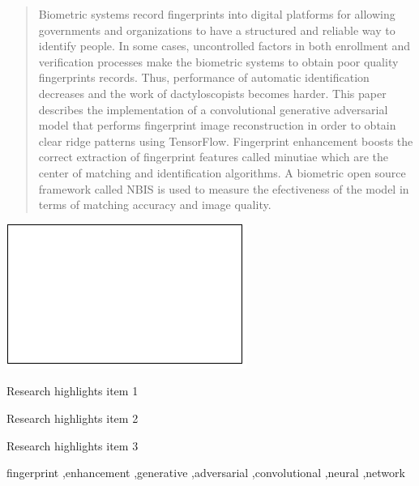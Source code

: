 \documentclass[a4paper,fleqn]{cas-dc}
\begin{document}
\begin{abstract}
Biometric systems record fingerprints into digital platforms for allowing governments and organizations to have a structured and reliable way to identify people. In some cases, uncontrolled factors in both enrollment and verification processes make the biometric systems to obtain poor quality fingerprints records. Thus, performance of automatic identification decreases and the work of dactyloscopists becomes harder. This paper describes the implementation of a convolutional generative adversarial model that performs fingerprint image reconstruction in order to obtain clear ridge patterns using TensorFlow. Fingerprint enhancement boosts the correct extraction of fingerprint features called minutiae which are the center of matching and identification algorithms. A biometric open source framework called NBIS is used to measure the efectiveness of the model in terms of matching accuracy and image quality.
\end{abstract}

\begin{graphicalabstract}
\includegraphics{figs/grabs.pdf}
\end{graphicalabstract}

\begin{highlights}
\item Research highlights item 1
\item Research highlights item 2
\item Research highlights item 3
\end{highlights}

\begin{keywords}
fingerprint \sep enhancement \sep generative \sep adversarial \sep convolutional \sep neural \sep network
\end{keywords}


\maketitle
\end{document}
